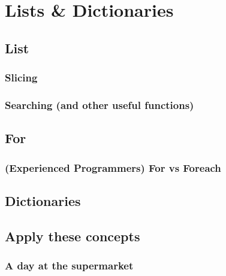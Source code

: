  

\chapter{Lists \& Dictionaries}

	\section{List}
	
		\subsection{Slicing}
		
		\subsection{Searching (and other useful functions)}
		
		
		
	\section{For}
	
		\subsection[For vs Foreach]{(Experienced Programmers) For vs Foreach}
		
	\section{Dictionaries}
	
	
	\section{Apply these concepts}
	
		\subsection{A day at the supermarket}
